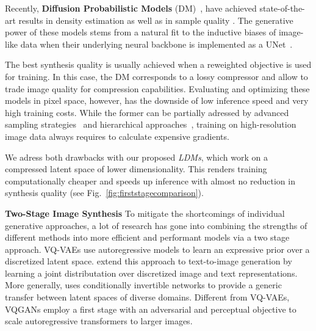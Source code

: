 Recently, \textbf{Diffusion Probabilistic Models} (DM)~\cite{DBLP:journals/corr/Sohl-DicksteinW15}, have achieved state-of-the-art results in density estimation \cite{DBLP:journals/corr/abs-2107-00630} as well as in sample quality \cite{DBLP:journals/corr/abs-2105-05233}. The generative power of these models stems from a natural fit to the inductive biases of image-like data when their underlying neural backbone is implemented as a UNet~\cite{DBLP:conf/miccai/RonnebergerFB15, DBLP:conf/nips/HoJA20, DBLP:journals/corr/abs-2011-13456, DBLP:journals/corr/abs-2105-05233}.

The best synthesis quality is usually achieved when a reweighted objective \cite{DBLP:conf/nips/HoJA20} is used for training. In this case, the DM corresponds to a lossy compressor and allow to trade image quality for compression capabilities. Evaluating and optimizing these models in pixel space, however, has the downside of low inference speed and very high training costs. While the former can be partially adressed by advanced sampling strategies~\cite{DBLP:conf/iclr/SongME21, DBLP:journals/corr/abs-2104-02600, DBLP:journals/corr/abs-2106-00132} and hierarchical approaches~\cite{DBLP:journals/corr/abs-2106-15282, DBLP:journals/corr/abs-2106-05931}, training on high-resolution image data always requires to calculate expensive gradients.

 We adress both drawbacks with our proposed \emph{LDMs}, which work on a compressed latent space of lower dimensionality. This renders training computationally cheaper and speeds up inference with almost no reduction in synthesis quality (see
 Fig.~\ref{fig:firststagecomparison}).

\textbf{Two-Stage Image Synthesis}
\enlargethispage{\baselineskip}
To mitigate the shortcomings of individual generative approaches, a lot of research \cite{DBLP:conf/iclr/DaiW19,  DBLP:conf/nips/RombachEO20, DBLP:journals/corr/abs-2012-09841, yu2021vectorquantized, DBLP:journals/corr/abs-2104-10157, DBLP:conf/nips/RazaviOV19} has gone into combining the strengths of different methods into more efficient and performant models via a two stage approach. VQ-VAEs \cite{DBLP:journals/corr/abs-2104-10157, DBLP:conf/nips/RazaviOV19} use autoregressive models to learn an expressive prior over a discretized latent space. \cite{DBLP:journals/corr/abs-2102-12092} extend this approach to text-to-image generation by learning a joint distributation over discretized image and text representations. More generally, \cite{DBLP:conf/nips/RombachEO20} uses conditionally invertible networks to provide a generic transfer between latent spaces of diverse domains. Different from VQ-VAEs, VQGANs \cite{DBLP:journals/corr/abs-2012-09841, yu2021vectorquantized} employ a first stage with an adversarial and perceptual objective to scale autoregressive transformers to larger images.

